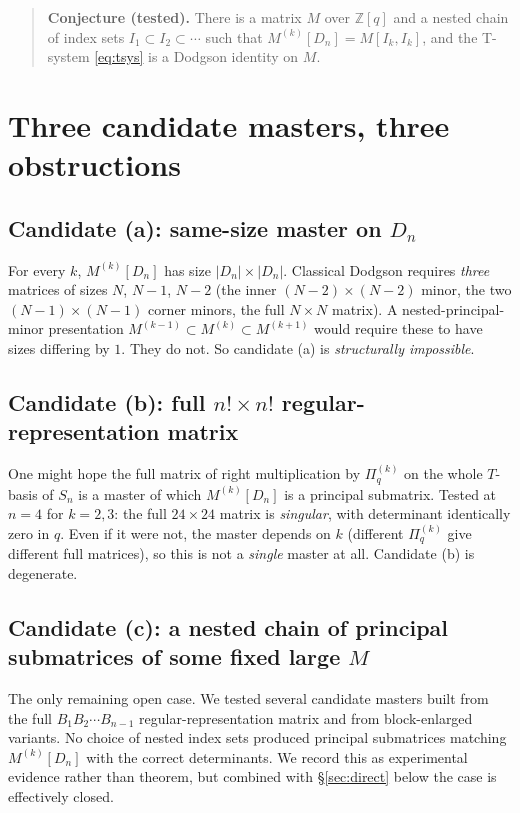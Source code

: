 \documentclass[11pt]{article}
\theoremstyle{definition}
\begin{document}
\begin{quote}
\textbf{Conjecture (tested).} There is a matrix $M$ over $\mathbb{Z}[q]$ and a nested chain of index sets $I_1 \subset I_2 \subset \cdots$ such that $M^{(k)}[D_n] = M[I_k, I_k]$, and the T-system \eqref{eq:tsys} is a Dodgson identity on $M$.
\end{quote}

\section{Three candidate masters, three obstructions}\label{sec:three}

\subsection*{Candidate (a): same-size master on \texorpdfstring{$D_n$}{D\_n}}
For every $k$, $M^{(k)}[D_n]$ has size $|D_n|\times |D_n|$. Classical Dodgson requires \emph{three} matrices of sizes $N$, $N-1$, $N-2$ (the inner $(N-2)\times (N-2)$ minor, the two $(N-1)\times (N-1)$ corner minors, the full $N\times N$ matrix). A nested-principal-minor presentation $M^{(k-1)} \subset M^{(k)} \subset M^{(k+1)}$ would require these to have sizes differing by $1$. They do not. So candidate (a) is \emph{structurally impossible}.

\subsection*{Candidate (b): full \texorpdfstring{$n! \times n!$}{n!xn!} regular-representation matrix}
One might hope the full matrix of right multiplication by $\Pi_q^{(k)}$ on the whole $T$-basis of $S_n$ is a master of which $M^{(k)}[D_n]$ is a principal submatrix. Tested at $n=4$ for $k=2,3$: the full $24\times 24$ matrix is \emph{singular}, with determinant identically zero in $q$. Even if it were not, the master depends on $k$ (different $\Pi_q^{(k)}$ give different full matrices), so this is not a \emph{single} master at all. Candidate (b) is degenerate.

\subsection*{Candidate (c): a nested chain of principal submatrices of some fixed large \texorpdfstring{$M$}{M}}
The only remaining open case. We tested several candidate masters built from the full $B_1 B_2 \cdots B_{n-1}$ regular-representation matrix and from block-enlarged variants. No choice of nested index sets produced principal submatrices matching $M^{(k)}[D_n]$ with the correct determinants. We record this as experimental evidence rather than theorem, but combined with \S\ref{sec:direct} below the case is effectively closed.
\end{document}
